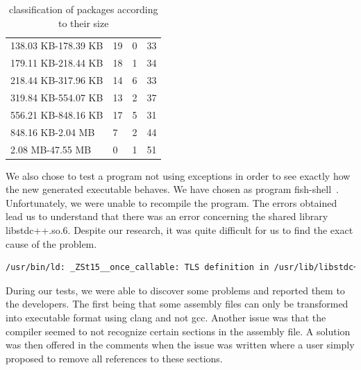 \documentclass[a4paper,11pt,oneside]{report}
\begin{document}
\begin{table}[H]
\begin{tabular}{llll}
        138.03 KB-178.39 KB & 19                           & 0                                 & 33                                    \\
        179.11 KB-218.44 KB & 18                           & 1                                 & 34                                    \\
        218.44 KB-317.96 KB & 14                           & 6                                 & 33                                    \\
        319.84 KB-554.07 KB & 13                           & 2                                 & 37                                    \\
        556.21 KB-848.16 KB & 17                           & 5                                 & 31                                    \\
        848.16 KB-2.04 MB   & 7                            & 2                                 & 44                                    \\
        2.08 MB-47.55 MB    & 0                            & 1                                 & 51    \\                               
        \hline
    \end{tabular}
    \caption{classification of packages according to their size}
\end{table}

We also chose to test a program not using exceptions in order to see exactly how the
new generated executable behaves. We have chosen as program
fish-shell~\cite{fish}. Unfortunately, we were unable to recompile the program.
The errors obtained lead us to understand that there was an error concerning
the shared library libstdc++.so.6. Despite our research, it was quite difficult
for us to find the exact cause of the problem.
\begin{lstlisting}[language=bash]
/usr/bin/ld: _ZSt15__once_callable: TLS definition in /usr/lib/libstdc++.so.6 section .tbss mismatches non-TLS reference in /tmp/ccAGaHdi.o
\end{lstlisting}

During our tests, we were able to discover some problems and reported them to
the developers. The first being that some assembly files can only be
transformed into executable format using clang and not gcc. Another issue was
that the compiler seemed to not recognize certain sections in the assembly
file. A solution was then offered in the comments when the issue was written
where a user simply proposed to remove all references to these sections.
\end{document}
